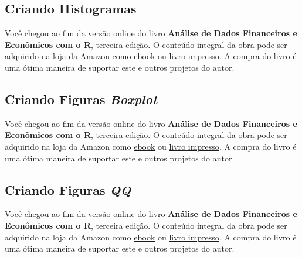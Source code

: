 \documentclass[
  11pt,
]{book}
\newenvironment{pleasebuyit}
{\begin{noteblock}
		
	} {\end{noteblock}}
\begin{document}
\hypertarget{criando-histogramas}{%
\subsection{Criando Histogramas}\label{criando-histogramas}}

\begin{pleasebuyit}
Você chegou ao fim da versão online do livro \textbf{Análise de Dados
Financeiros e Econômicos com o R}, terceira edição. O conteúdo integral
da obra pode ser adquirido na loja da Amazon como
\href{https://www.amazon.com.br/dp/B08WNC27ZY}{ebook} ou
\href{https://www.amazon.com/dp/B08WP8CCDB}{livro impresso}. A compra do
livro é uma ótima maneira de suportar este e outros projetos do autor.
\end{pleasebuyit}

\hypertarget{criando-figuras-boxplot}{%
\subsection{\texorpdfstring{Criando Figuras \emph{Boxplot}}{Criando Figuras Boxplot}}\label{criando-figuras-boxplot}}

\begin{pleasebuyit}
Você chegou ao fim da versão online do livro \textbf{Análise de Dados
Financeiros e Econômicos com o R}, terceira edição. O conteúdo integral
da obra pode ser adquirido na loja da Amazon como
\href{https://www.amazon.com.br/dp/B08WNC27ZY}{ebook} ou
\href{https://www.amazon.com/dp/B08WP8CCDB}{livro impresso}. A compra do
livro é uma ótima maneira de suportar este e outros projetos do autor.
\end{pleasebuyit}

\hypertarget{criando-figuras-qq}{%
\subsection{\texorpdfstring{Criando Figuras \emph{QQ}}{Criando Figuras QQ}}\label{criando-figuras-qq}}

\begin{pleasebuyit}
Você chegou ao fim da versão online do livro \textbf{Análise de Dados
Financeiros e Econômicos com o R}, terceira edição. O conteúdo integral
da obra pode ser adquirido na loja da Amazon como
\href{https://www.amazon.com.br/dp/B08WNC27ZY}{ebook} ou
\href{https://www.amazon.com/dp/B08WP8CCDB}{livro impresso}. A compra do
livro é uma ótima maneira de suportar este e outros projetos do autor.
\end{pleasebuyit}
\end{document}
